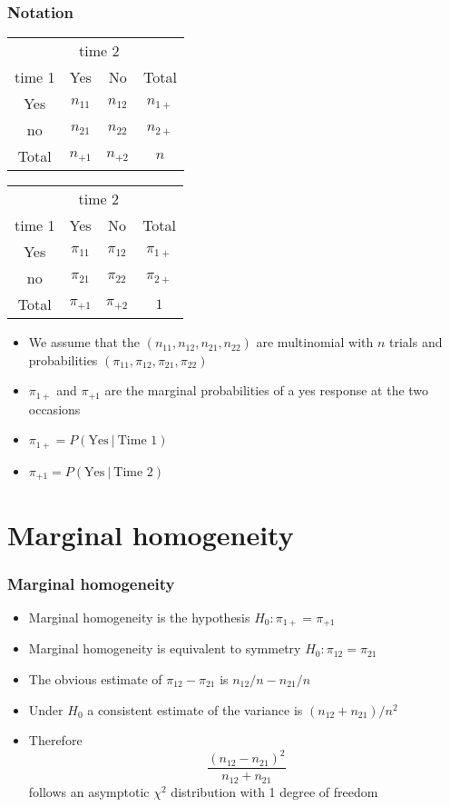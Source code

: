 \documentclass[aspectratio=169]{beamer}
\begin{document}
\begin{frame}\frametitle{Notation}
  \begin{center}
\ttfamily
    \begin{tabular}{cccc} 
   & \multicolumn{2}{c}{time 2} & \\
time 1 & Yes & No & Total\\
  Yes  & $n_{11}$ & $n_{12}$ & $n_{1+}$\\
   no  & $n_{21}$ & $n_{22}$ & $n_{2+}$\\
Total  & $n_{+1}$ & $n_{+2}$ & $n$
    \end{tabular}
    \begin{tabular}{cccc} 
   & \multicolumn{2}{c}{time 2} & \\
time 1 & Yes & No & Total\\
  Yes  & $\pi_{11}$ & $\pi_{12}$ & $\pi_{1+}$\\
   no  & $\pi_{21}$ & $\pi_{22}$ & $\pi_{2+}$\\
Total  & $\pi_{+1}$ & $\pi_{+2}$ & $1$
    \end{tabular}
  \end{center}
  \begin{itemize}
  \item We assume that the $(n_{11},n_{12},n_{21},n_{22})$ are multinomial
    with $n$ trials and probabilities $(\pi_{11},\pi_{12},\pi_{21},\pi_{22})$
  \item $\pi_{1+}$ and $\pi_{+1}$ are the marginal
    probabilities of a yes response at the two occasions
  \item $\pi_{1+} = P(\mbox{Yes} ~|~ \mbox{Time 1})$
  \item $\pi_{+1} = P(\mbox{Yes} ~|~ \mbox{Time 2})$
  \end{itemize}
\end{frame}

\section{Marginal homogeneity}
\begin{frame}\frametitle{Marginal homogeneity}
\begin{itemize}
\item Marginal homogeneity is the hypothesis $H_0:\pi_{1+} = \pi_{+1}$
\item Marginal homogeneity is equivalent to symmetry
  $H_0:\pi_{12} = \pi_{21}$ 
\item The obvious estimate of  $\pi_{12} - \pi_{21}$ is 
  $n_{12}/n - n_{21}/n$
\item Under $H_0$ a consistent estimate of the variance is
   $(n_{12} + n_{21}) / n ^ 2$ 
\item Therefore 
  $$
  \frac{(n_{12} - n_{21})^2}{n_{12} + n_{21}}
  $$
follows an asymptotic $\chi^2$ distribution with 1 degree of freedom
\end{itemize}
\end{frame}
\end{document}
